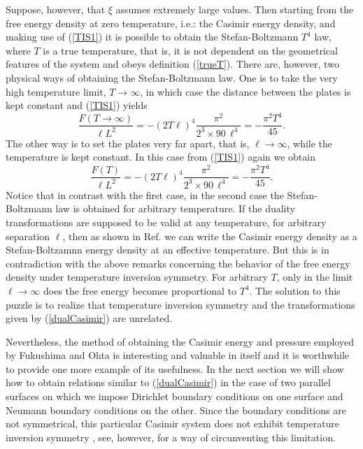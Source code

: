 \documentclass[a4paper,12pt]{article}
\begin{document}
Suppose, however, that $\xi$ assumes extremely large values. Then starting from the free energy density at zero temperature, i.e.: the Casimir energy density, and making use of (\ref{TIS1}) it is possible to obtain the Stefan-Boltzmann $T^4$ law, where $T$ is a true temperature, that is, it is not dependent on the geometrical features of the system and obeys definition (\ref{trueT}). There are, however, two physical ways of obtaining the Stefan-Boltzmann law. One is to take the very high temperature limit, $T\to\infty$, in which case the distance between the plates is kept constant and (\ref{TIS1})  yields
%
\begin{equation}
\frac{F\left(T\to\infty\right)}{\ell L^2}=-\left(2T\ell\right)^4\frac{\pi^2}{2^3\times90\,\ell^4}=-\frac{\pi^2T^4}{45}.
\end{equation}
%
The other way is to set the plates very far apart, that is, $\ell\to\infty$, while the temperature is kept constant. In this case from (\ref{TIS1}) again we obtain
%
\begin{equation}
\frac{F\left(T\right)}{\ell L^2}=-\left(2T\ell\right)^4\frac{\pi^2}{2^3\times90\,\ell^4}=-\frac{\pi^2T^4}{45}.
\end{equation}
%
Notice that in contrast with the first case, in the second case the Stefan-Boltzmann law is obtained for arbitrary temperature. If the duality transformations are supposed to be valid at any temperature, for arbitrary separation $\ell$, then as shown in Ref. \cite{Fukushima&Ohta2001} we can write the Casimir energy density as a Stefan-Boltzamnn energy density at an effective temperature. But this is in contradiction with the above remarks concerning the behavior of the free energy density under temperature inversion symmetry. For arbitrary $T$, only in the limit $\ell\to\infty$ does the free energy becomes proportional to $T^4$. The solution to this puzzle is to realize that temperature inversion symmetry and the transformations given by (\ref{dualCasimir}) are unrelated.
 
Nevertheless, the method of obtaining the Casimir energy and pressure employed by Fukushima and Ohta is interesting and valuable in itself and it is worthwhile to provide one more example of its usefulness. In the next section we will show how to obtain relations similar to (\ref{dualCasimir}) in the case of two parallel surfaces on which we impose  Dirichlet boundary conditions on one surface and Neumann boundary conditions on the other. Since the boundary conditions are not symmetrical, this particular Casimir system does not exhibit temperature inversion symmetry \cite{Ravndal&Tollefsen89}, see, however, \cite{Santos&Tort1999} for a way of circunventing this limitation. 
%
\end{document}
